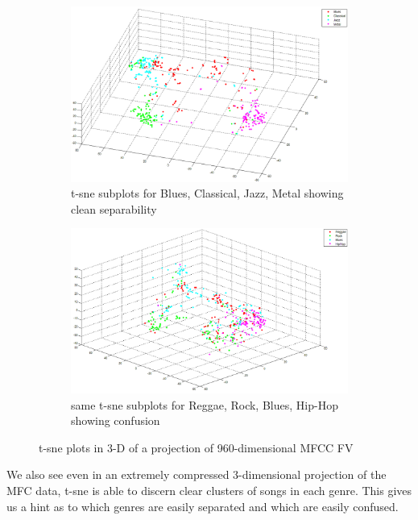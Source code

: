 \begin{figure}[h]
	\begin{subfigure}[b]{0.49\textwidth}
		\includegraphics[width=\textwidth]{blues_classical_jazz_metal.png}
		\caption{t-sne subplots for Blues, Classical, Jazz, Metal showing clean separability}
		\label{fig:tsne1}
	\end{subfigure}
	\hfill
	\begin{subfigure}[b]{0.49\textwidth}
		\includegraphics[width=\textwidth]{reggae_rock_blues_hiphop.png}
		\caption{same t-sne subplots for Reggae, Rock, Blues, Hip-Hop showing confusion}
		\label{fig:tsne2}
	\end{subfigure}
	\caption{t-sne plots in 3-D of a projection of 960-dimensional MFCC FV}
\end{figure}
We also see even in an extremely compressed 3-dimensional projection of the MFC data, t-sne is able to discern clear clusters of songs in each genre. This gives us a hint as to which genres are easily separated and which are easily confused.
